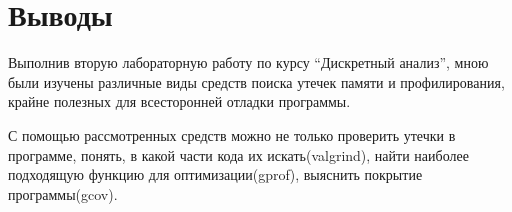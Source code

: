 \section{Выводы}

Выполнив вторую лабораторную работу по курсу \enquote{Дискретный анализ}, мною были изучены различные виды средств поиска утечек памяти и профилирования, крайне полезных для всесторонней отладки программы.\newline

С помощью рассмотренных средств можно не только проверить утечки в программе, понять, в какой части кода их
искать(valgrind), найти наиболее подходящую функцию для оптимизации(gprof), выяснить покрытие программы(gcov).\newline

\pagebreak
